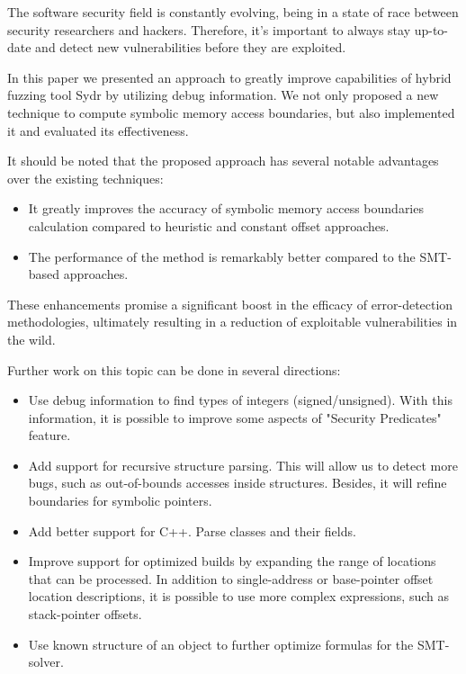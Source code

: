 \documentclass[conference]{IEEEtran}
\begin{document}
The software security field is constantly evolving, being in a state of race between security researchers and hackers. Therefore, it's important to always stay up-to-date and detect new vulnerabilities before they are exploited.

In this paper we presented an approach to greatly improve capabilities of hybrid fuzzing tool Sydr by utilizing debug information. We not only proposed a new technique to compute symbolic memory access boundaries, but also implemented it and evaluated its effectiveness.

It should be noted that the proposed approach has several notable advantages over the existing techniques:
\begin{itemize}
    \item It greatly improves the accuracy of symbolic memory access boundaries calculation compared to heuristic and constant offset approaches.
    \item The performance of the method is remarkably better compared to the SMT-based approaches.
\end{itemize}

These enhancements promise a significant boost in the efficacy of error-detection methodologies, ultimately resulting in a reduction of exploitable vulnerabilities in the wild.

\vspace{0.2cm}

Further work on this topic can be done in several directions:

\begin{itemize}
    \item Use debug information to find types of integers (signed/unsigned). With this information, it is possible to improve some aspects of "Security Predicates" feature.
    \item Add support for recursive structure parsing. This will allow us to detect more bugs, such as out-of-bounds accesses inside structures. Besides, it will refine boundaries for symbolic pointers.
    \item Add better support for C++. Parse classes and their fields.
    \item Improve support for optimized builds by expanding the range of locations that can be processed. In addition to single-address or base-pointer offset location descriptions, it is possible to use more complex expressions, such as stack-pointer offsets.
    \item Use known structure of an object to further optimize formulas for the SMT-solver.
\end{itemize}







\end{document}
